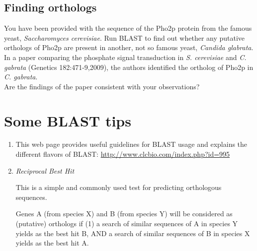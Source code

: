 \documentclass[a4paper,11pt]{article}
\begin{document}
\subsection{Finding orthologs}

You have been provided with the sequence of the Pho2p protein from the famous yeast, \emph{Saccharomyces cerevisiae}. Run BLAST to find out whether any putative orthologs of Pho2p are present in another, not so famous yeast, \emph{Candida glabrata}.\\

In a paper comparing the phosphate signal transduction in \emph{S. cerevisiae} and \emph{C. gabrata} (Genetics 182:471-9,2009), the authors identified the ortholog of Pho2p in \emph{C. gabrata}. \\

Are the findings of the paper consistent with your observations?

\section{Some BLAST tips}

\begin{enumerate}
\item This web page provides useful guidelines for BLAST usage and explains the different flavors of BLAST:
\url{http://www.clcbio.com/index.php?id=995}

\item \emph{Reciprocal Best Hit}

This is a simple and commonly used test for predicting orthologous sequences.

Genes A (from species X) and B (from species Y) will be considered as (putative) orthologs if (1) a search of similar sequences of A in species Y yields as the best hit B, AND a search of similar sequences of B in species X yields as the best hit A.
\end{enumerate}
\end{document}
